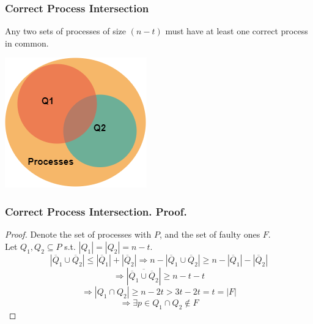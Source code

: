 
\begin{frame}
    \frametitle{Correct Process Intersection}
    \begin{lemma}
        Any two sets of processes of size $(n-t)$ must have
        at least one correct process in common.
    \end{lemma}
    \begin{center}
        \includegraphics[scale=.5]{resources/lemma2_venn.png}
    \end{center}
\end{frame}
\begin{frame}
    \frametitle{Correct Process Intersection. Proof.}
    \begin{proof}
        Denote the set of processes with $P$, and the set of faulty ones $F$.\\
        Let $Q_1,Q_2\subseteq P$ s.t. $|Q_1|=|Q_2|=n-t$.\\
        \[
            |\overline{Q}_1\cup\overline{Q}_2|\leq |\overline{Q}_1|+|\overline{Q}_2|
            \Rightarrow n-|\overline{Q}_1\cup\overline{Q}_2|\geq n-|\overline{Q}_1|-|\overline{Q}_2|
        \]\[
            \Rightarrow |\overline{\overline{Q}_1\cup\overline{Q}_2}|\geq n-t-t
        \]\[
            \Rightarrow |Q_1\cap Q_2|\geq n-2t>3t-2t=t=|F|
        \]\[
            \Rightarrow \exists p\in Q_1\cap Q_2\notin F
        \]
    \end{proof}
\end{frame}

